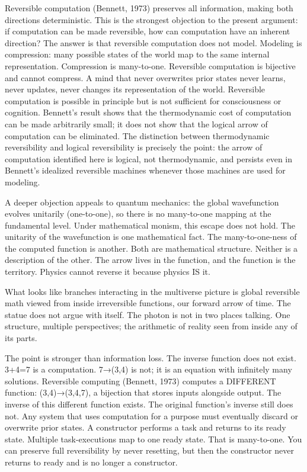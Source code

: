 \documentclass[
]{article}
\begin{document}
Reversible computation (Bennett, 1973) preserves all information, making
both directions deterministic. This is the strongest objection to the
present argument: if computation can be made reversible, how can
computation have an inherent direction? The answer is that reversible
computation does not model. Modeling is compression: many possible
states of the world map to the same internal representation. Compression
is many-to-one. Reversible computation is bijective and cannot compress.
A mind that never overwrites prior states never learns, never updates,
never changes its representation of the world. Reversible computation is
possible in principle but is not sufficient for consciousness or
cognition. Bennett's result shows that the thermodynamic cost of
computation can be made arbitrarily small; it does not show that the
logical arrow of computation can be eliminated. The distinction between
thermodynamic reversibility and logical reversibility is precisely the
point: the arrow of computation identified here is logical, not
thermodynamic, and persists even in Bennett's idealized reversible
machines whenever those machines are used for modeling.

A deeper objection appeals to quantum mechanics: the global wavefunction
evolves unitarily (one-to-one), so there is no many-to-one mapping at
the fundamental level. Under mathematical monism, this escape does not
hold. The unitarity of the wavefunction is one mathematical fact. The
many-to-one-ness of the computed function is another. Both are
mathematical structure. Neither is a description of the other. The arrow
lives in the function, and the function is the territory. Physics cannot
reverse it because physics IS it.

What looks like branches interacting in the multiverse picture is global
reversible math viewed from inside irreversible functions, our forward
arrow of time. The statue does not argue with itself. The photon is not
in two places talking. One structure, multiple perspectives; the
arithmetic of reality seen from inside any of its parts.

The point is stronger than information loss. The inverse function does
not exist. 3+4=7 is a computation. 7→(3,4) is not; it is an equation
with infinitely many solutions. Reversible computing (Bennett, 1973)
computes a DIFFERENT function: (3,4)→(3,4,7), a bijection that stores
inputs alongside output. The inverse of this different function exists.
The original function's inverse still does not. Any system that uses
computation for a purpose must eventually discard or overwrite prior
states. A constructor performs a task and returns to its ready state.
Multiple task-executions map to one ready state. That is many-to-one.
You can preserve full reversibility by never resetting, but then the
constructor never returns to ready and is no longer a constructor.
\end{document}

